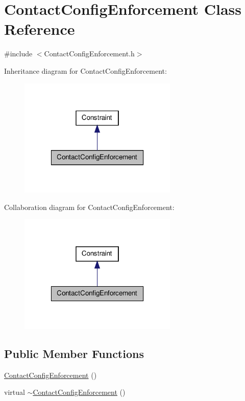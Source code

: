 \hypertarget{classContactConfigEnforcement}{\section{\-Contact\-Config\-Enforcement \-Class \-Reference}
\label{classContactConfigEnforcement}
}


{\ttfamily \#include $<$\-Contact\-Config\-Enforcement.\-h$>$}



\-Inheritance diagram for \-Contact\-Config\-Enforcement\-:\nopagebreak
\begin{figure}[H]
\begin{center}
\leavevmode
\includegraphics[width=214pt]{classContactConfigEnforcement__inherit__graph}
\end{center}
\end{figure}


\-Collaboration diagram for \-Contact\-Config\-Enforcement\-:\nopagebreak
\begin{figure}[H]
\begin{center}
\leavevmode
\includegraphics[width=214pt]{classContactConfigEnforcement__coll__graph}
\end{center}
\end{figure}
\subsection*{\-Public \-Member \-Functions}
\begin{DoxyCompactItemize}
\item 
\hyperlink{classContactConfigEnforcement_affa2663e090bfc8ba63b2a32a31f1707}{\-Contact\-Config\-Enforcement} ()
\item 
virtual \hyperlink{classContactConfigEnforcement_a8a58b4c421e538be35979680c96fd1d9}{$\sim$\-Contact\-Config\-Enforcement} ()
\end{DoxyCompactItemize}
